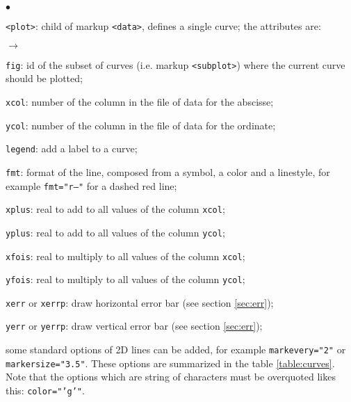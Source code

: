 \documentclass[a4paper,10pt,twoside]{csshortdoc}
\begin{document}
\begin{list}{$\bullet$}{}
\item \texttt{<plot>}: child of markup \texttt{<data>}, defines a single
curve; the attributes are:
\begin{list}{$\rightarrow$}{}
\item \texttt{fig}: id of the subset of curves (i.e. markup \texttt{<subplot>})
where the current curve should be plotted;
\item \texttt{xcol}: number of the column in the file of data for the abscisse;
\item \texttt{ycol}: number of the column in the file of data for the ordinate;
\item \texttt{legend}: add a label to a curve;
\item \texttt{fmt}: format of the line, composed from a symbol, a color and a
linestyle, for example \texttt{fmt="r--"} for a dashed red line;
\item \texttt{xplus}: real to add to all values of the column \texttt{xcol};
\item \texttt{yplus}: real to add to all values of the column \texttt{ycol};
\item \texttt{xfois}: real to multiply to all values of the column
\texttt{xcol};
\item \texttt{yfois}: real to multiply to all values of the column
\texttt{ycol};
\item \texttt{xerr} or \texttt{xerrp}: draw horizontal error bar (see section \ref{sec:err});
\item \texttt{yerr} or \texttt{yerrp}: draw vertical error bar (see section \ref{sec:err});
\item some standard options of 2D lines can be added, for example
\texttt{markevery="2"} or \texttt{markersize="3.5"}. These options
are summarized in the table \ref{table:curves}. Note that the options
which are string of characters must be overquoted likes this:
\texttt{color="'g'"}.


\end{list}
\end{list}
\end{document}
